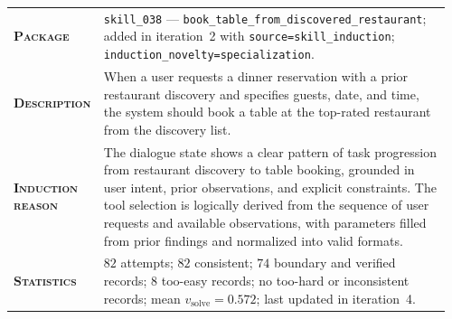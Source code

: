 \begin{table}[htbp]
\centering
\begin{minipage}{0.97\textwidth}
\raggedright
\small
\setlength{\tabcolsep}{3pt}
\renewcommand{\arraystretch}{1.16}
\vspace{0.35em}
\begin{tabular}{@{}>{\raggedright\arraybackslash\bfseries}p{0.17\linewidth} >{\raggedright\arraybackslash}p{0.79\linewidth}@{}}
    \textsc{Package} & \texttt{skill\_038} --- \texttt{book\_table\_from\_discovered\_restaurant}; added in iteration~2 with \texttt{source=skill\_induction}; \texttt{induction\_novelty=specialization}. \\
    \textsc{Description} & When a user requests a dinner reservation with a prior restaurant discovery and specifies guests, date, and time, the system should book a table at the top-rated restaurant from the discovery list. \\
    \textsc{Induction reason} & The dialogue state shows a clear pattern of task progression from restaurant discovery to table booking, grounded in user intent, prior observations, and explicit constraints. The tool selection is logically derived from the sequence of user requests and available observations, with parameters filled from prior findings and normalized into valid formats. \\
    \textsc{Statistics} & $82$ attempts; $82$ consistent; $74$ boundary and verified records; $8$ too-easy records; no too-hard or inconsistent records; mean $v_\text{solve}=0.572$; last updated in iteration~4. \\
\end{tabular}
\vspace{0.45em}
\end{minipage}
\end{table}

